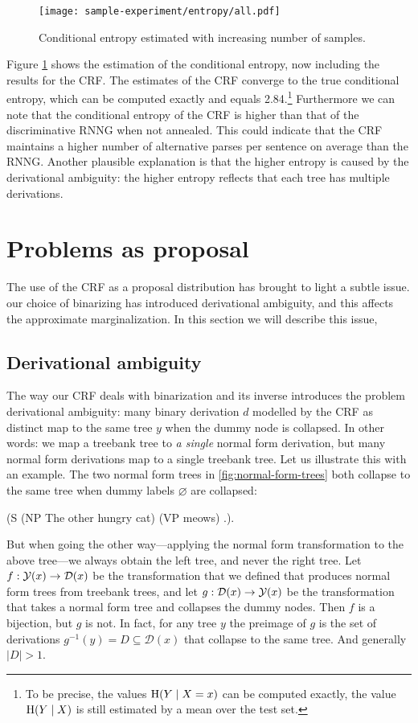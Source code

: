     \begin{figure}[h]
      \center
      \texttt{[image: sample-experiment/entropy/all.pdf]}
    \caption{Conditional entropy estimated with increasing number of samples.}
    \label{fig:samples-entropy}
    \end{figure}

    Figure \ref{fig:samples-entropy} shows the estimation of the conditional entropy, now including the results for the CRF. The estimates of the CRF converge to the true conditional entropy, which can be computed exactly and equals 2.84.\footnote{To be precise, the values $\operatorname{H}(Y \mid X = x)$ can be computed exactly, the value $\operatorname{H}(Y \mid X)$ is still estimated by a mean over the test set.} Furthermore we can note that the conditional entropy of the CRF is higher than that of the discriminative RNNG when not annealed. This could indicate that the CRF maintains a higher number of alternative parses per sentence on average than the RNNG. Another plausible explanation is that the higher entropy is caused by the derivational ambiguity: the higher entropy reflects that each tree has multiple derivations.

\section{Problems as proposal}
  The use of the CRF as a proposal distribution has brought to light a subtle issue. our choice of binarizing has introduced derivational ambiguity, and this affects the approximate marginalization. In this section we will describe this issue,

  \subsection{Derivational ambiguity}
    The way our CRF deals with binarization and its inverse introduces the problem derivational ambiguity: many binary derivation $d$ modelled by the CRF as distinct map to the same tree $y$ when the dummy node is collapsed. In other words: we map a treebank tree to \textit{a single} normal form derivation, but many normal form derivations map to a single treebank tree. Let us illustrate this with an example. The two normal form trees in \ref{fig:normal-form-trees} both collapse to the same tree when dummy labels $\varnothing$ are collapsed:
    \begin{center}
      (S (NP The other hungry cat) (VP meows) .).
    \end{center}
    But when going the other way---applying the normal form transformation to the above tree---we always obtain the left tree, and never the right tree. Let $f: \mathcal{Y}(x) \to \mathcal{D}(x)$ be the transformation that we defined that produces normal form trees from treebank trees, and let $g: \mathcal{D}(x) \to \mathcal{Y}(x)$ be the transformation that takes a normal form tree and collapses the dummy nodes. Then $f$ is a bijection, but $g$ is not. In fact, for any tree $y$ the preimage of $g$ is the set of derivations $g^{-1}( y ) = D \subseteq \mathcal{D}(x)$ that collapse to the same tree. And generally $\lvert D \rvert > 1$.

